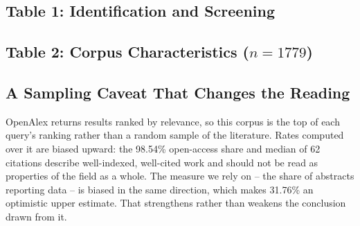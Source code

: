 \documentclass{article}
\begin{document}
\subsection{Table 1: Identification and Screening}
\begin{table}[htbp]
\centering
{}
\end{table}


\subsection{Table 2: Corpus Characteristics ($n = 1779$)}
\begin{table}[htbp]
\centering
{}
\end{table}


\subsection{A Sampling Caveat That Changes the Reading}


OpenAlex returns results ranked by relevance, so this corpus is the top of each query's ranking rather than a random sample of the literature. Rates computed over it are biased upward: the 98.54\% open-access share and median of 62 citations describe well-indexed, well-cited work and should not be read as properties of the field as a whole. The measure we rely on -- the share of abstracts reporting data -- is biased in the same direction, which makes 31.76\% an optimistic upper estimate. That strengthens rather than weakens the conclusion drawn from it.
\end{document}
